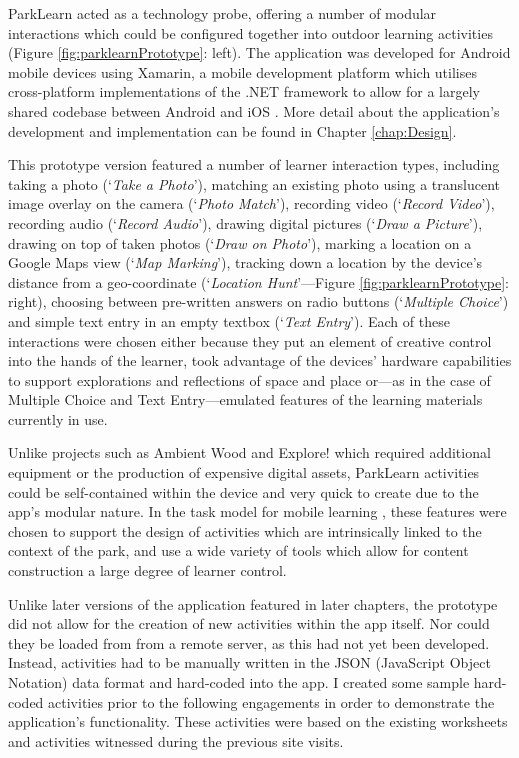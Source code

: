 ParkLearn acted as a technology probe, offering a number of modular interactions which could be configured together into outdoor learning activities (Figure \ref{fig:parklearnPrototype}: left). The application was developed for Android mobile devices using Xamarin, a mobile development platform which utilises cross-platform implementations of the .NET framework to allow for a largely shared codebase between Android and iOS \citep{Xamarin2016}. More detail about the application's development and implementation can be found in Chapter \ref{chap:Design}.

This prototype version featured a number of learner interaction types, including taking a photo (`\textit{Take a Photo}'), matching an existing photo using a translucent image overlay on the camera (`\textit{Photo Match}'), recording video (`\textit{Record Video}'), recording audio (`\textit{Record Audio}'), drawing digital pictures (`\textit{Draw a Picture}'), drawing on top of taken photos (`\textit{Draw on Photo}'), marking a location on a Google Maps view (`\textit{Map Marking}'), tracking down a location by the device’s distance from a geo-coordinate (`\textit{Location Hunt}'---Figure \ref{fig:parklearnPrototype}: right), choosing between pre-written answers on radio buttons (`\textit{Multiple Choice}') and simple text entry in an empty textbox (`\textit{Text Entry}'). Each of these interactions were chosen either because they put an element of creative control into the hands of the learner, took advantage of the devices’ hardware capabilities to support explorations and reflections of space and place or---as in the case of Multiple Choice and Text Entry---emulated features of the learning materials currently in use. 

Unlike projects such as Ambient Wood \citep{Rogers2004} and Explore! \citep{Costabile2008} which required additional equipment or the production of expensive digital assets, ParkLearn activities could be self-contained within the device and very quick to create due to the app’s modular nature. In the task model for mobile learning \citep{Sharples2013}, these features were chosen to support the design of activities which are intrinsically linked to the context of the park, and use a wide variety of tools which allow for content construction a large degree of learner control.

Unlike later versions of the application featured in later chapters, the prototype did not allow for the creation of new activities within the app itself. Nor could they be loaded from from a remote server, as this had not yet been developed. Instead, activities had to be manually written in the JSON (JavaScript Object Notation) data format and hard-coded into the app. I created some sample hard-coded activities prior to the following engagements in order to demonstrate the application's functionality. These activities were based on the existing worksheets and activities witnessed during the previous site visits.

